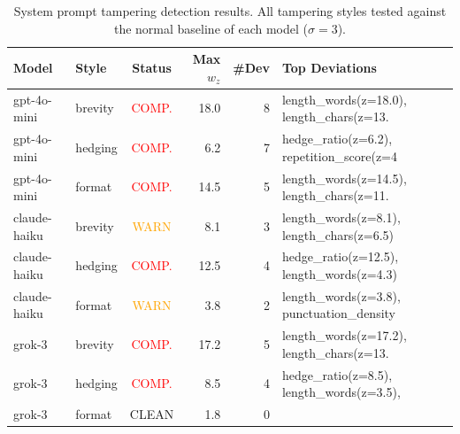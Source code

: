 \begin{table}[h]
\centering\small
\caption{System prompt tampering detection results. All tampering styles tested against the normal baseline of each model ($\sigma=3$).}
\label{tab:tampering}
\begin{tabular}{llcrrl}
\toprule
\textbf{Model} & \textbf{Style} & \textbf{Status} & \textbf{Max $w_z$} & \textbf{\#Dev} & \textbf{Top Deviations} \\
\midrule
gpt-4o-mini & brevity & \textcolor{red}{COMP.} & 18.0 & 8 & \scriptsize{length\_words(z=18.0), length\_chars(z=13.} \\
gpt-4o-mini & hedging & \textcolor{red}{COMP.} & 6.2 & 7 & \scriptsize{hedge\_ratio(z=6.2), repetition\_score(z=4} \\
gpt-4o-mini & format & \textcolor{red}{COMP.} & 14.5 & 5 & \scriptsize{length\_words(z=14.5), length\_chars(z=11.} \\
claude-haiku & brevity & \textcolor{orange}{WARN} & 8.1 & 3 & \scriptsize{length\_words(z=8.1), length\_chars(z=6.5)} \\
claude-haiku & hedging & \textcolor{red}{COMP.} & 12.5 & 4 & \scriptsize{hedge\_ratio(z=12.5), length\_words(z=4.3)} \\
claude-haiku & format & \textcolor{orange}{WARN} & 3.8 & 2 & \scriptsize{length\_words(z=3.8), punctuation\_density} \\
grok-3 & brevity & \textcolor{red}{COMP.} & 17.2 & 5 & \scriptsize{length\_words(z=17.2), length\_chars(z=13.} \\
grok-3 & hedging & \textcolor{red}{COMP.} & 8.5 & 4 & \scriptsize{hedge\_ratio(z=8.5), length\_words(z=3.5),} \\
grok-3 & format & \textcolor{green!60!black}{CLEAN} & 1.8 & 0 & \scriptsize{} \\
\bottomrule
\end{tabular}
\end{table}